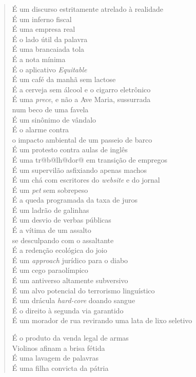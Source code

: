 \begin{verse}
É um discurso estritamente atrelado à realidade\\
É um inferno fiscal\\
É uma empresa real\\
É o lado útil da palavra\\[5pt]
É uma brancaiada tola\\
É a nota mínima\\
É o aplicativo \emph{Equitable}\\
É um café da manhã sem lactose\\[5pt]
É a cerveja sem álcool e o cigarro eletrônico\\
É uma \emph{prece}, e não a Ave Maria, sussurrada\\
num beco de uma favela\\
É um sinônimo de vândalo\\[5pt]
É o alarme contra\\
o impacto ambiental de um passeio de barco\\
É um protesto contra aulas de inglês\\
É uma tr@b@lh@dor@ em transição de empregos\\[5pt]
É um supervilão asfixiando apenas machos\\
É um chá com escritores do \emph{website} e do jornal\\
É um \emph{pet} sem sobrepeso\\
É a queda programada da taxa de juros\\[5pt]
É um ladrão de galinhas\\
É um desvio de verbas públicas\\
É a vítima de um assalto\\
se desculpando com o assaltante\\[5pt]
É a redenção ecológica do joio\\
É um \emph{approach} jurídico para o diabo\\
É um cego paraolímpico\\
É um antiverso altamente subversivo\\[5pt]
É um alvo potencial do terrorismo linguístico\\
É um drácula \emph{hard-core} doando sangue\\
É o direito à segunda via garantido\\
É um morador de rua revirando uma lata de lixo seletivo\\[5pt]

\pagebreak

É o produto da venda legal de armas\\
Violinos afinam a brisa fétida\\
É uma lavagem de palavras\\
É uma filha convicta da pátria
\end{verse}

